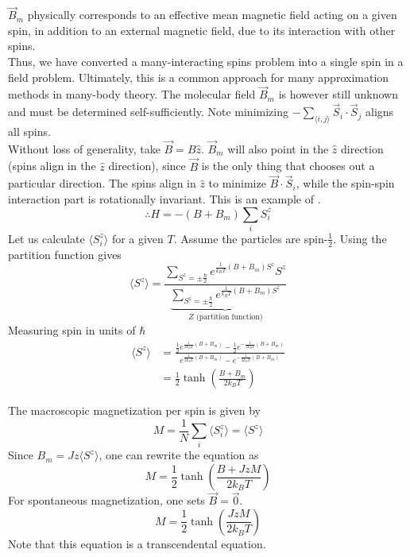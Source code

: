 \documentclass[12pt,a4paper,titlepage]{article}
\newcommand{\trm}[1]{\textrm{#1}} %
\newcommand{\ul}[1]{\underline{\smash{#1}}} %
\begin{document}
$\vec{B}_{m}$ physically corresponds to an effective mean magnetic field acting on a given spin, in addition to an external magnetic field, due to its interaction with other spins.\\

Thus, we have converted a many-interacting spins problem into a single spin in a field problem. Ultimately, this is a common approach for many approximation methods in many-body theory. The molecular field $\vec{B}_{m}$ is however still unknown and must be determined self-sufficiently. Note minimizing $-\sum_{\langle i,j\rangle}\vec{S}_{i}\cdot\vec{S}_{j}$ aligns all spins.\\

Without loss of generality, take $\vec{B}=B\hat{z}$. $\vec{B}_{m}$ will also point in the $\hat{z}$ direction (spins align in the $\hat{z}$ direction), since $\vec{B}$ is the only thing that chooses out a particular direction. The spins align in $\hat{z}$ to minimize $\vec{B}\cdot\vec{S}_{i}$, while the spin-spin interaction part is rotationally invariant. This is an example of \ul{spontaneously broken symmetry}.
\begin{equation}
\therefore H=-(B+B_{m})\sum_{i}S_{i}^{z}
\end{equation}
Let us calculate $\langle S_{i}^{z}\rangle$ for a given $T$. Assume the particles are spin-$\frac{1}{2}$. Using the partition function gives
\begin{equation}
\langle S^{z}\rangle=\frac{\sum\limits_{S^{z}=\pm\frac{\hbar}{2}}e^{\frac{1}{k_{B}T}(B+B_{m})S^{z}}S^{z}}{\underbrace{\sum_{S^{z}=\pm\frac{\hbar}{2}}e^{\frac{1}{k_{B}T}(B+B_{m})S^{z}}}_{Z\trm{ (partition function)}}}
\end{equation}
Measuring spin in units of $\hbar$
\begin{equation}
\begin{aligned}
\langle S^{z}\rangle&=\frac{\frac{1}{2}e^{\frac{1}{2k_{B}T}(B+B_{m})}-\frac{1}{2}e^{-\frac{1}{2k_{B}T}(B+B_{m})}}{e^{\frac{1}{2k_{B}T}(B+B_{m})}-e^{-\frac{1}{2k_{B}T}(B+B_{m})}}\\
&=\frac{1}{2}\tanh\left(\frac{B+B_{m}}{2k_{B}T}\right)
\end{aligned}
\end{equation}

The macroscopic magnetization per spin is given by
\begin{equation}
M=\frac{1}{N}\sum_{i}\langle S_{i}^{z}\rangle=\langle S^{z}\rangle
\end{equation}
Since $B_{m}=Jz\langle S^{z}\rangle$, one can rewrite the equation as
\begin{equation}
M=\frac{1}{2}\tanh\left(\frac{B+JzM}{2k_{B}T}\right)
\end{equation}
For spontaneous magnetization, one sets $\vec{B}=\vec{0}$.
\begin{equation}
M=\frac{1}{2}\tanh\left(\frac{JzM}{2k_{B}T}\right)
\end{equation}
Note that this equation is a transcendental equation.
\end{document}
